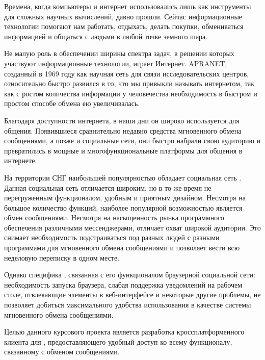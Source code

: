 
Времена, когда компьютеры и интернет использовались лишь как инструменты для
сложных научных вычислений, давно прошли. Сейчас информационные
технологии помогают нам работать, отдыхать, делать покупки, обмениваться
информацией и общаться с людьми в любой точке земного шара. 

Не малую роль в обеспечении ширины спектра задач, в решении которых участвуют информационные технологии, 
играет Интернет. APRANET, созданный в 1969 году как научная сеть для связи
исследовательских центров, относительно быстро развился в то, что мы привыкли
называть интернетом, так как с ростом количества информации  у
человечества необходимость в быстром и простом способе обмена ею увеличивалась.

Благодаря доступности интернета, в наши дни он широко используется для общения.
Появившиеся сравнительно недавно средства мгновенного обмена сообщениями, а
позже и социальные сети, они быстро набрали свою аудиторию и превратились в
мощные и многофункциональные платформы для общения в интернете.

На территории СНГ наибольшей популярностью обладает социальная сеть
\vk{}. Данная социальная сеть отличается широким, но в то же время не
перегруженным функционалом, удобным и приятным дизайном. Несмотря на
большое количество функций, наиболее популярной возможностью \vk{} является
обмен сообщениями. Несмотря на насыщенность рынка программного обеспечения
различными мессенджерами, \vk{} отличает охват широкой аудитории. Это снимает
необходимость подстраиваться под разных людей с разными программами для
мгновенного обмена сообщениями и позволяет вести всю неделовую \mbox{переписку}
в одном месте.

Однако специфика \vk{}, связанная с его функционалом браузерной социальной
сети: необходимость запуска браузера, слабая поддержка уведомлений на рабочем
столе, отвлекающие элементы в веб-интерфейсе и некоторые другие проблемы, не
позволяет добиться максимального удобства использования в качестве системы мгновенного обмена сообщениями.

Целью данного курсового проекта является разработка кроссплатформенного клиента
для \vk{}, предоставляющего удобный доступ ко всему функционалу, связанному с
обменом сообщениями.
